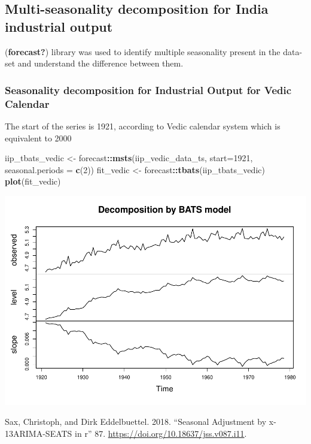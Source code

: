 \documentclass[
]{article}
\newenvironment{Shaded}{\begin{snugshade}}{\end{snugshade}}
\newcommand{\AttributeTok}[1]{\textcolor[rgb]{0.13,0.29,0.53}{#1}}
\newcommand{\DecValTok}[1]{\textcolor[rgb]{0.00,0.00,0.81}{#1}}
\newcommand{\FunctionTok}[1]{\textcolor[rgb]{0.13,0.29,0.53}{\textbf{#1}}}
\newcommand{\NormalTok}[1]{#1}
\newcommand{\OtherTok}[1]{\textcolor[rgb]{0.56,0.35,0.01}{#1}}
\newcommand{\SpecialCharTok}[1]{\textcolor[rgb]{0.81,0.36,0.00}{\textbf{#1}}}
\newlength{\cslhangindent}
\newlength{\cslentryspacingunit} %
\newenvironment{CSLReferences}[2] %
 {%
  \setlength{\parindent}{0pt}
  \ifodd #1
  \let\oldpar\par
  \def\par{\hangindent=\cslhangindent\oldpar}
  \fi
  \setlength{\parskip}{#2\cslentryspacingunit}
 }%
 {}
\begin{document}
\hypertarget{multi-seasonality-decomposition-for-india-industrial-output}{%
\subsection{Multi-seasonality decomposition for India industrial
output}\label{multi-seasonality-decomposition-for-india-industrial-output}}

(\textbf{forecast?}) library was used to identify multiple seasonality
present in the data-set and understand the difference between them.

\hypertarget{seasonality-decomposition-for-industrial-output-for-vedic-calendar}{%
\subsubsection{Seasonality decomposition for Industrial Output for Vedic
Calendar}\label{seasonality-decomposition-for-industrial-output-for-vedic-calendar}}

The start of the series is 1921, according to Vedic calendar system
which is equivalent to 2000

\begin{Shaded}
\begin{Highlighting}[]
\NormalTok{iip\_tbats\_vedic }\OtherTok{\textless{}{-}}\NormalTok{ forecast}\SpecialCharTok{::}\FunctionTok{msts}\NormalTok{(iip\_vedic\_data\_ts, }\AttributeTok{start=}\DecValTok{1921}\NormalTok{, }\AttributeTok{seasonal.periods =} \FunctionTok{c}\NormalTok{(}\DecValTok{2}\NormalTok{))}
\NormalTok{fit\_vedic }\OtherTok{\textless{}{-}}\NormalTok{ forecast}\SpecialCharTok{::}\FunctionTok{tbats}\NormalTok{(iip\_tbats\_vedic)}
\FunctionTok{plot}\NormalTok{(fit\_vedic)}
\end{Highlighting}
\end{Shaded}

\includegraphics{regressors_of_diwali_seasonality_for_industrial_production_files/figure-latex/unnamed-chunk-13-1.pdf}

\hypertarget{refs}{}
\begin{CSLReferences}{1}{0}
\leavevmode{}%
Sax, Christoph, and Dirk Eddelbuettel. 2018. {``Seasonal Adjustment by
{\textbraceleft}x-13ARIMA-SEATS{\textbraceright} in
{\textbraceleft}r{\textbraceright}''} 87.
\url{https://doi.org/10.18637/jss.v087.i11}.

\end{CSLReferences}
\end{document}
